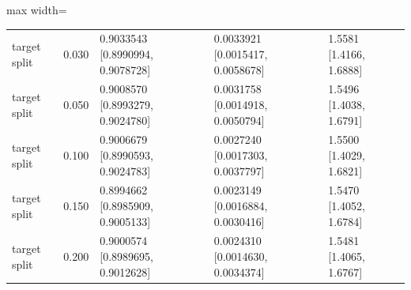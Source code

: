 \begin{table}[!tbp]
\begin{adjustbox}{max width=\textwidth}
\begin{tabular}{@{}lllll@{}}
target split & 0.030 & 0.9033543 [0.8990994, 0.9078728] & 0.0033921 [0.0015417, 0.0058678] & 1.5581 [1.4166, 1.6888] \\
target split & 0.050 & 0.9008570 [0.8993279, 0.9024780] & 0.0031758 [0.0014918, 0.0050794] & 1.5496 [1.4038, 1.6791] \\
target split & 0.100 & 0.9006679 [0.8990593, 0.9024783] & 0.0027240 [0.0017303, 0.0037797] & 1.5500 [1.4029, 1.6821] \\
target split & 0.150 & 0.8994662 [0.8985909, 0.9005133] & 0.0023149 [0.0016884, 0.0030416] & 1.5470 [1.4052, 1.6784] \\
target split & 0.200 & 0.9000574 [0.8989695, 0.9012628] & 0.0024310 [0.0014630, 0.0034374] & 1.5481 [1.4065, 1.6767] \\
\bottomrule
\end{tabular}
\end{adjustbox}
\end{table}

